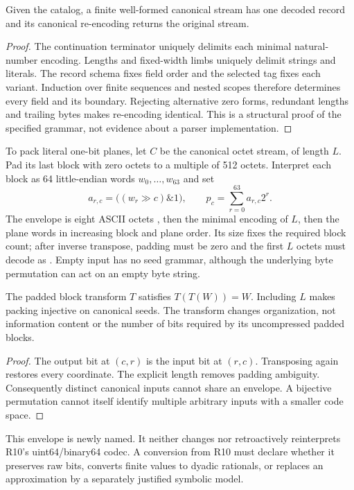 \begin{proposition}
Given the catalog, a finite well-formed canonical stream has one decoded record
and its canonical re-encoding returns the original stream.
\end{proposition}
\begin{proof}
The continuation terminator uniquely delimits each minimal natural-number
encoding. Lengths and fixed-width limbs uniquely delimit strings and literals.
The record schema fixes field order and the selected tag fixes each variant.
Induction over finite sequences and nested scopes therefore determines every
field and its boundary. Rejecting alternative zero forms, redundant lengths and
trailing bytes makes re-encoding identical. This is a structural proof of the
specified grammar, not evidence about a parser implementation.
\end{proof}

To pack literal one-bit planes, let $C$ be the canonical octet stream, of length
$L$. Pad its last block with zero octets to a multiple of 512 octets. Interpret
each block as 64 little-endian words $w_0,\ldots,w_{63}$ and set
\[
 a_{r,c}=\bigl((w_r\gg c)\mathbin{\&}1\bigr),\qquad
 p_c=\sum_{r=0}^{63}a_{r,c}2^r.
\]
The envelope is eight ASCII octets , then the minimal encoding of
$L$, then the plane words in increasing block and plane order. Its size fixes
the required block count; after inverse transpose, padding must be zero and the
first $L$ octets must decode as . Empty input has no seed grammar,
although the underlying byte permutation can act on an empty byte string.

\begin{proposition}
The padded block transform $T$ satisfies $T(T(W))=W$. Including $L$ makes packing
injective on canonical seeds. The transform changes organization, not information
content or the number of bits required by its uncompressed padded blocks.
\end{proposition}
\begin{proof}
The output bit at $(c,r)$ is the input bit at $(r,c)$. Transposing again restores
every coordinate. The explicit length removes padding ambiguity. Consequently
distinct canonical inputs cannot share an envelope. A bijective permutation
cannot itself identify multiple arbitrary inputs with a smaller code space.
\end{proof}
This envelope is newly named. It neither changes nor retroactively reinterprets
R10's uint64/binary64 codec. A conversion from R10 must declare whether it
preserves raw bits, converts finite values to dyadic rationals, or replaces an
approximation by a separately justified symbolic model.

